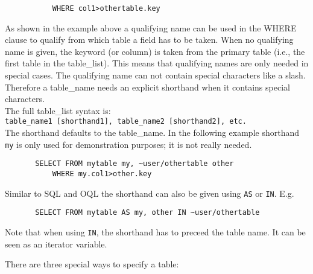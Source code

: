 \begin{description}
\begin{verbatim}
           WHERE col1>othertable.key
       \end{verbatim}
       As shown in the example above a qualifying name
       can be used in the WHERE
       clause to qualify from which table a field has to be taken.
       When no qualifying name is given, the keyword (or column) is taken
       from the primary table (i.e., the first table in the table\_list).
       This means that qualifying names are only needed in special cases.
       The qualifying name can not contain special characters like a slash.
       Therefore a table\_name needs an explicit shorthand when it contains
       special characters.
       \\The full table\_list syntax is:
       \\
       \texttt{table\_name1 [shorthand1], table\_name2 [shorthand2], etc.}
       \\The shorthand defaults to the table\_name.
       In the following example shorthand \texttt{my} is only used
       for demonstration purposes; it is not really needed.
       \begin{verbatim}
       SELECT FROM mytable my, ~user/othertable other
           WHERE my.col1>other.key
       \end{verbatim}
       Similar to SQL and OQL the shorthand can also be given using
       \texttt{AS} or \texttt{IN}. E.g.
       \begin{verbatim}
       SELECT FROM mytable AS my, other IN ~user/othertable
       \end{verbatim}
       Note that when using \texttt{IN}, the shorthand has to preceed
       the table name. It can be seen as an iterator variable.

       There are three special ways to specify a table:
       \begin{enumerate}
       

\end{enumerate}
\end{description}
